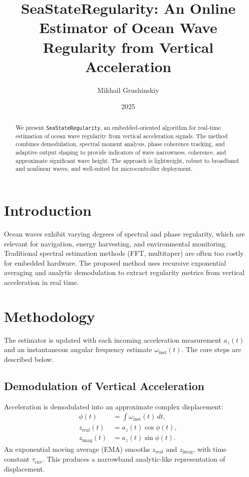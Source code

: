 \documentclass[11pt]{article}
\title{SeaStateRegularity: An Online Estimator of Ocean Wave Regularity from Vertical Acceleration}
\author{Mikhail Grushinskiy}
\date{2025}
\begin{document}
\maketitle

\begin{abstract}
We present \texttt{SeaStateRegularity}, an embedded-oriented algorithm for real-time estimation of ocean wave regularity from vertical acceleration signals. 
The method combines demodulation, spectral moment analysis, phase coherence tracking, and adaptive output shaping to provide indicators of wave narrowness, coherence, and approximate significant wave height. 
The approach is lightweight, robust to broadband and nonlinear waves, and well-suited for microcontroller deployment.
\end{abstract}

\section{Introduction}
Ocean waves exhibit varying degrees of spectral and phase regularity, which are relevant for navigation, energy harvesting, and environmental monitoring. 
Traditional spectral estimation methods (FFT, multitaper) are often too costly for embedded hardware. 
The proposed method uses recursive exponential averaging and analytic demodulation to extract regularity metrics from vertical acceleration in real time.

\section{Methodology}
The estimator is updated with each incoming acceleration measurement $a_z(t)$ and an instantaneous angular frequency estimate $\omega_{\text{inst}}(t)$. 
The core steps are described below.

\subsection{Demodulation of Vertical Acceleration}
Acceleration is demodulated into an approximate complex displacement:
\begin{align}
\phi(t) &= \int \omega_{\text{inst}}(t)\, dt, \\
z_{\text{real}}(t) &= a_z(t)\cos\phi(t), \\
z_{\text{imag}}(t) &= a_z(t)\sin\phi(t).
\end{align}
An exponential moving average (EMA) smooths $z_{\text{real}}$ and $z_{\text{imag}}$, with time constant $\tau_{\text{env}}$. 
This produces a narrowband analytic-like representation of displacement.
\end{document}

